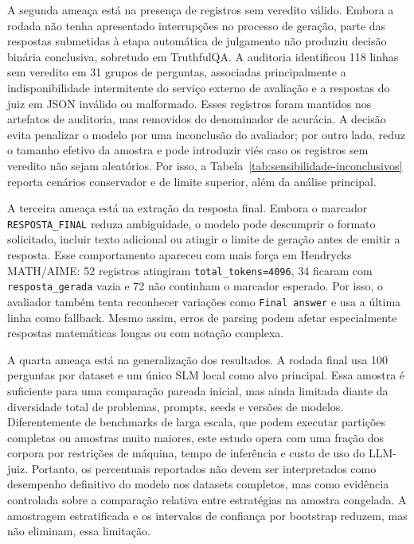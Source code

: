 \documentclass[12pt]{article}
\begin{document}
A segunda ameaça está na presença de registros sem veredito válido. Embora a rodada não tenha apresentado interrupções no processo de geração, parte das respostas submetidas à etapa automática de julgamento não produziu decisão binária conclusiva, sobretudo em TruthfulQA. A auditoria identificou 118 linhas sem veredito em 31 grupos de perguntas, associadas principalmente a indisponibilidade intermitente do serviço externo de avaliação e a respostas do juiz em JSON inválido ou malformado. Esses registros foram mantidos nos artefatos de auditoria, mas removidos do denominador de acurácia. A decisão evita penalizar o modelo por uma inconclusão do avaliador; por outro lado, reduz o tamanho efetivo da amostra e pode introduzir viés caso os registros sem veredito não sejam aleatórios. Por isso, a Tabela~\ref{tab:sensibilidade-inconclusivos} reporta cenários conservador e de limite superior, além da análise principal.

A terceira ameaça está na extração da resposta final. Embora o marcador \texttt{RESPOSTA\_FINAL} reduza ambiguidade, o modelo pode descumprir o formato solicitado, incluir texto adicional ou atingir o limite de geração antes de emitir a resposta. Esse comportamento apareceu com mais força em Hendrycks MATH/AIME: 52 registros atingiram \texttt{total\_tokens=4096}, 34 ficaram com \texttt{resposta\_gerada} vazia e 72 não continham o marcador esperado. Por isso, o avaliador também tenta reconhecer variações como \texttt{Final answer} e usa a última linha como fallback. Mesmo assim, erros de parsing podem afetar especialmente respostas matemáticas longas ou com notação complexa.

A quarta ameaça está na generalização dos resultados. A rodada final usa 100 perguntas por dataset e um único SLM local como alvo principal. Essa amostra é suficiente para uma comparação pareada inicial, mas ainda limitada diante da diversidade total de problemas, prompts, seeds e versões de modelos. Diferentemente de benchmarks de larga escala, que podem executar partições completas ou amostras muito maiores, este estudo opera com uma fração dos corpora por restrições de máquina, tempo de inferência e custo de uso do LLM-juiz. Portanto, os percentuais reportados não devem ser interpretados como desempenho definitivo do modelo nos datasets completos, mas como evidência controlada sobre a comparação relativa entre estratégias na amostra congelada. A amostragem estratificada e os intervalos de confiança por bootstrap reduzem, mas não eliminam, essa limitação.
\end{document}
